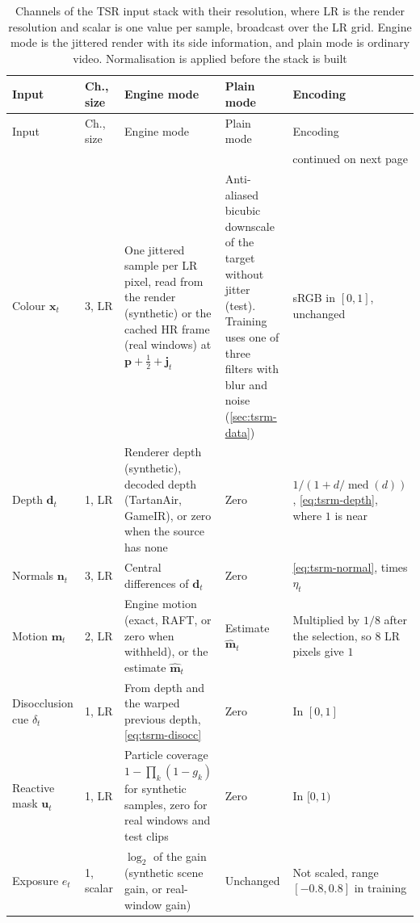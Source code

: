 \FloatBarrier

{\footnotesize\raggedright\setlength{\tabcolsep}{3pt}\begin{longtable}{@{}p{}p{}p{}p{}p{}@{}}
\caption{Channels of the TSR input stack with their resolution, where LR is the render resolution and scalar is one value per sample, broadcast over the LR grid. Engine mode is the jittered render with its side information, and plain mode is ordinary video. Normalisation is applied before the stack is built}\label{tab:tsrm-inputs}\\
\toprule
Input & Ch., size & Engine mode & Plain mode & Encoding \\
\midrule
\endfirsthead
\toprule
Input & Ch., size & Engine mode & Plain mode & Encoding \\
\midrule
\endhead
\midrule
\multicolumn{5}{r}{\footnotesize continued on next page}\\
\endfoot
\botrule
\endlastfoot
Colour $\mathbf{x}_t$ & 3, LR & One jittered sample per LR pixel, read from the render (synthetic) or the cached HR frame (real windows) at $\mathbf{p}+\tfrac12+\mathbf{j}_t$ & Anti-aliased bicubic downscale of the target without jitter (test). Training uses one of three filters with blur and noise (\cref{sec:tsrm-data}) & sRGB in $[0,1]$, unchanged \\
Depth $\mathbf{d}_t$ & 1, LR & Renderer depth (synthetic), decoded depth (TartanAir, GameIR), or zero when the source has none & Zero & $1/(1+d/\operatorname{med}(d))$, \cref{eq:tsrm-depth}, where $1$ is near \\
Normals $\mathbf{n}_t$ & 3, LR & Central differences of $\mathbf{d}_t$ & Zero & \cref{eq:tsrm-normal}, times $\eta_t$ \\
Motion $\mathbf{m}_t$ & 2, LR & Engine motion (exact, RAFT, or zero when withheld), or the estimate $\hat{\mathbf{m}}_t$ & Estimate $\hat{\mathbf{m}}_t$ & Multiplied by $1/8$ after the selection, so $8$ LR pixels give $1$ \\
Disocclusion cue $\delta_t$ & 1, LR & From depth and the warped previous depth, \cref{eq:tsrm-disocc} & Zero & In $[0,1]$ \\
Reactive mask $\mathbf{u}_t$ & 1, LR & Particle coverage $1-\prod_k(1-g_k)$ for synthetic samples, zero for real windows and test clips & Zero & In $[0,1)$ \\
Exposure $e_t$ & 1, scalar & $\log_2$ of the gain (synthetic scene gain, or real-window gain) & Unchanged & Not scaled, range $[-0.8,0.8]$ in training \\

\end{longtable}}
